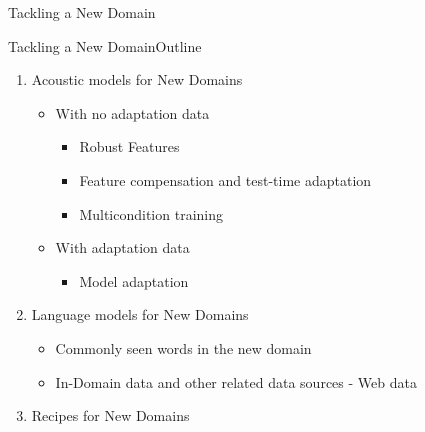 \begin{frame}
  \begin{center}
    {\color{Maroon}\Huge Tackling a New Domain}
  \end{center}
\end{frame}

\begin{frame}{Tackling a New Domain}{Outline}
  \begin{enumerate}
  \item  Acoustic models for New Domains
    \begin{itemize}
    \item With no adaptation data
	\begin{itemize}
	  \item Robust Features
	  \item Feature compensation and test-time adaptation
          \item Multicondition training
	\end{itemize}
    \item With adaptation data
	\begin{itemize}
         \item Model adaptation
        \end{itemize}
    \end{itemize}
  \item  Language models for New Domains
    \begin{itemize}
    \item Commonly seen words in the new domain
    \item In-Domain data and other related data sources - Web data
    \end{itemize}
  \item Recipes for New Domains
  \end{enumerate}
\end{frame}

